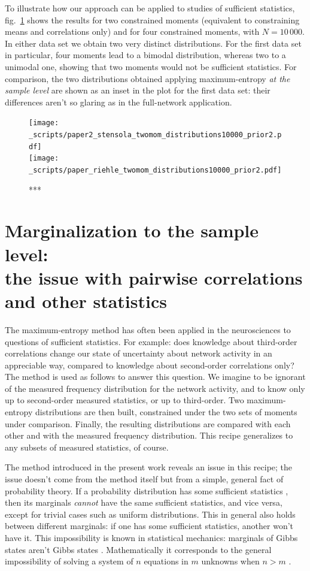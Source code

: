 \documentclass[\ifafour a4paper,12pt,\else a5paper,10pt,\fi%
onecolumn,oneside,article,%
british%
]{memoir}
\theoremstyle{remark}
\theoremstyle{innote}
\newcommand*{\citep}{\parencites}
\renewcommand*{\|}{\nonscript\,\vert\nonscript\;\mathopen{}}
\newcommand*{\sect}{\S}%
\newcommand*{\fig}{fig.}%
\begin{document}
To illustrate how our approach can be applied to studies of sufficient
statistics, \fig~\ref{fig:plots_2_4mom} shows the results for two
constrained moments (equivalent to constraining means and correlations
only) and for four constrained moments, with $N=10\,000$. In either data
set we obtain two very distinct distributions. For the first data set in
particular, four moments lead to a bimodal distribution, whereas two to a
unimodal one, showing that two moments would not be sufficient
statistics. For comparison, the two distributions obtained applying
maximum-entropy \emph{at the sample level} are shown as an inset in the
plot for the first data set: their differences aren't so glaring as in the
full-network application.
\begin{figure}[!p]
\centering
\texttt{[image: \_scripts/paper2\_stensola\_twomom\_distributions10000\_prior2.pdf]}%
\\[3em]%
\texttt{[image: \_scripts/paper\_riehle\_twomom\_distributions10000\_prior2.pdf]}%
\caption{***}
\label{fig:plots_2_4mom}
\end{figure}


\section{Marginalization to the sample level:\\ the issue with pairwise
  correlations and other statistics}
\label{sec:marginalization}

The maximum-entropy method has often been applied in the neurosciences to
questions of sufficient statistics. For example: does knowledge about
third-order correlations change our state of uncertainty about network
activity in an appreciable way, compared to knowledge about second-order
correlations only? The method is used as follows to answer this question.
We imagine to be ignorant of the measured frequency distribution for the
network activity, and to know only up to second-order measured statistics,
or up to third-order. Two maximum-entropy distributions are then built,
constrained under the two sets of moments under comparison. Finally, the
resulting distributions are compared with each other and with the measured
frequency distribution. This recipe generalizes to any subsets of measured
statistics, of course.

The method introduced in the present work reveals an issue in this recipe;
the issue doesn't come from the method itself but from a simple, general
fact of probability theory. If a probability distribution has some
sufficient statistics \citep[\sect~4.5]{bernardoetal1994}{fortinietal2000},
then its marginals \emph{cannot} have the same sufficient statistics, and
vice versa, except for trivial cases such as uniform distributions. This in
general also holds between different marginals: if one has some sufficient
statistics, another won't have it. This impossibility is known in
statistical mechanics: marginals of Gibbs states aren't Gibbs states
\citep{maesetal1999}. Mathematically it corresponds to the general
impossibility of solving a system of $n$ equations in $m$ unknowns when
$n>m$ \citep[\sect~3.1]{portamanaetal2015}[\sect~3]{portamanaetal2018b}.
\end{document}
